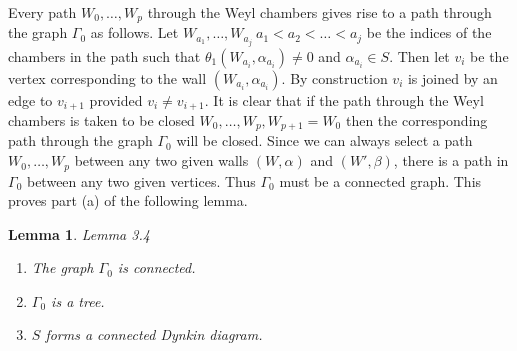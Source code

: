 \documentclass{memo-l}
\newtheorem{lemma}[theorem]{Lemma}
\theoremstyle{definition}
\theoremstyle{remark}
\numberwithin{section}{chapter}
\numberwithin{equation}{chapter}
\begin{document}
   Every path $W_{0},\ldots ,W_{p}$ through the Weyl chambers gives rise to
a path through the graph ${\Gamma}_{0}$ as follows.  Let $W_{a_1},\ldots ,
W_{a_j} \ a_{1} < a_{2} < \ldots < a_{j}$ be the indices of
the chambers in the path such that ${\theta}_{1}(W_{a_{i}},{\alpha}_{a_{i}})
\ne 0$ and ${\alpha}_{a_{i}}  \in  S$.  Then
let $v_{i}$ be the vertex corresponding to the wall $(W_{a_{i}},
{\alpha}_{a_{i}})$.  By construction $v_{i}$ is joined by an edge
to $v_{i+1}$ provided $v_{i}\ne v_{i+1}$.  It is clear that if the path
through the Weyl chambers is taken to be closed $W_{0},\ldots ,
W_{p},W_{p+1} = W_{0}$ then the corresponding path through the graph
${\Gamma}_{0}$ will be closed.  Since we can always select a path
$W_{0},\ldots ,W_{p}$ between any two given walls $(W,{\alpha})$ and
$(W',{\beta})$, there is a path in ${\Gamma}_{0}$ between any two given
vertices.  Thus ${\Gamma}_{0}$ must be a connected graph.  This proves part
(a) of the following lemma.

\medskip

\begin{lemma}{Lemma 3.4}
\begin{enumerate}[label=\alph*)]
\item The graph ${\Gamma}_{0}$ is connected.
\item ${\Gamma}_{0}$ is a tree.
\item $S$ forms a connected Dynkin diagram.
\end{enumerate}
\end{lemma}

\medskip
\end{document}
